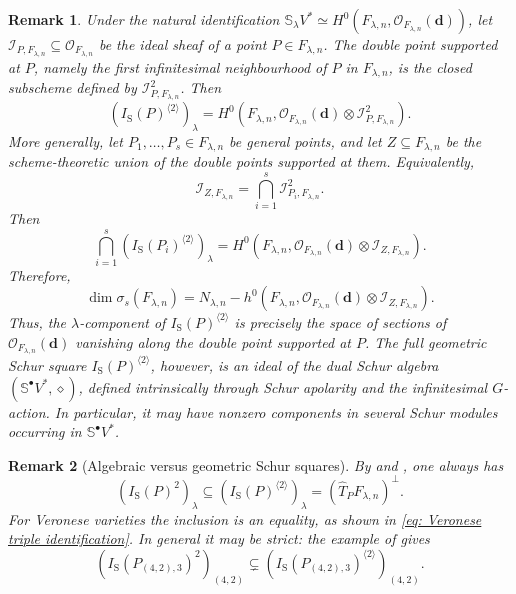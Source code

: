 \documentclass[a4paper,reqno]{amsart}
\theoremstyle{plainnopunct}
\theoremstyle{definitionnopunct}
\newtheorem{remark}[remark]{Remark}
\renewcommand{\S}{\mathbb{S}}
\newcommand{\cO}{\mathcal{O}}
\newcommand{\cI}{\mathcal{I}}
\newcommand{\bd}{\mathbf{d}}
\begin{document}
\begin{remark}
\label{rem: geometric meaning Schur square}
Under the natural identification
$\S_\lambda V^*
\simeq
H^0
\left(
F_{\lambda,n},
\cO_{F_{\lambda,n}}(\bd)
\right)$,
let
$\cI_{P,F_{\lambda,n}}
\subseteq
\cO_{F_{\lambda,n}}$
be the ideal sheaf of a point
$P\in F_{\lambda,n}$.
The double point supported at $P$, namely the first infinitesimal
neighbourhood of $P$ in $F_{\lambda,n}$, is the closed subscheme
defined by $\cI_{P,F_{\lambda,n}}^2$. Then
\[
\left(
I_{\mathrm S}(P)^{\langle2\rangle}
\right)_\lambda
=
H^0
\left(
F_{\lambda,n},
\cO_{F_{\lambda,n}}(\bd)
\otimes
\cI_{P,F_{\lambda,n}}^2
\right).
\]
More generally, let
$P_1,\ldots,P_s\in F_{\lambda,n}$
be general points, and let
$Z\subseteq F_{\lambda,n}$
be the scheme-theoretic union of the double points supported at them.
Equivalently,
\[
\cI_{Z,F_{\lambda,n}}
=
\bigcap_{i=1}^s
\cI_{P_i,F_{\lambda,n}}^2.
\]
Then
\[
\bigcap_{i=1}^s
\left(
I_{\mathrm S}(P_i)^{\langle2\rangle}
\right)_\lambda
=
H^0
\left(
F_{\lambda,n},
\cO_{F_{\lambda,n}}(\bd)
\otimes
\cI_{Z,F_{\lambda,n}}
\right).
\]
Therefore,
\[
\dim\sigma_s(F_{\lambda,n})
=
N_{\lambda,n}
-
h^0
\left(
F_{\lambda,n},
\cO_{F_{\lambda,n}}(\bd)
\otimes
\cI_{Z,F_{\lambda,n}}
\right).
\]
Thus, the $\lambda$-component of
$I_{\mathrm S}(P)^{\langle2\rangle}$
is precisely the space of sections of
$\cO_{F_{\lambda,n}}(\bd)$
vanishing along the double point supported at $P$.
The full geometric Schur square
$I_{\mathrm S}(P)^{\langle2\rangle}$,
however, is an ideal of the dual Schur algebra
$(\S^\bullet V^*,\diamond)$,
defined intrinsically through Schur apolarity and the infinitesimal
$G$-action. In particular, it may have nonzero components in several
Schur modules occurring in $\S^\bullet V^*$.
\end{remark}

\begin{remark}[Algebraic versus geometric Schur squares]
\label{rem: algebraic versus geometric Schur squares}
By
 and ,
one always has
\[\left(
I_{\mathrm S}(P)^2
\right)_\lambda
\subseteq
\left(
I_{\mathrm S}(P)^{\langle2\rangle}
\right)_\lambda
=
\left(
\widehat T_PF_{\lambda,n}
\right)^\perp.
\]
For Veronese varieties the inclusion is an equality, as shown in
\eqref{eq: Veronese triple identification}. In general it may be
strict: the example of
gives
\[
\left(
I_{\mathrm S}(P_{(4,2),3})^2
\right)_{(4,2)}
\subsetneq
\left(
I_{\mathrm S}(P_{(4,2),3})^{\langle2\rangle}
\right)_{(4,2)}.
\]
\end{remark}
\end{document}
